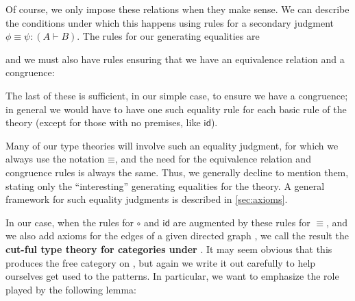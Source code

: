 \documentclass{book}
\def\idfunc{\mathsf{id}}
\def\equivsym{\mathord{\equiv}}
\let\types\vdash
\begin{document}
Of course, we only impose these relations when they make sense.
We can describe the conditions under which this happens using rules for a secondary judgment $\phi\equiv \psi : (A\types B)$.
The rules for our generating equalities are
and we must also have rules ensuring that we have an equivalence relation and a congruence:
The last of these is sufficient, in our simple case, to ensure we have a congruence; in general we would have to have one such equality rule for each basic rule of the theory (except for those with no premises, like $\idfunc$).

Many of our type theories will involve such an equality judgment, for which we always use the notation $\equivsym$, and the need for the equivalence relation and congruence rules is always the same.
Thus, we generally decline to mention them, stating only the ``interesting'' generating equalities for the theory.
A general framework for such equality judgments is described in \cref{sec:axioms}.

In our case, when the rules for $\circ$ and $\idfunc$ are augmented by these rules for $\equiv$, and we also add axioms for the edges of a given directed graph \cG, we call the result the \textbf{cut-ful type theory for categories under \cG}.
It may seem obvious that this produces the free category on \cG, but again we write it out carefully to help ourselves get used to the patterns.
In particular, we want to emphasize the role played by the following lemma:
\end{document}
